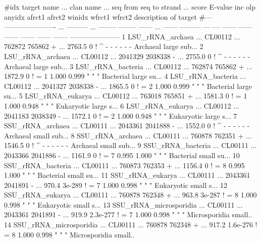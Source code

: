 \begin{tinysreoutput}
#idx target name            ... clan name ... seq from   seq to strand ...  score   E-value inc olp anyidx afrct1 afrct2 winidx wfrct1 wfrct2 description of target
#--- ---------------------- ... --------- ... -------- -------- ------ ... ------ --------- --- --- ------ ------ ------ ------ ------ ------ ---------------------
1    LSU_rRNA_archaea       ... CL00112   ...   762872   765862      + ... 2763.5         0  !   ^       -      -      -      -      -      - Archaeal large sub...
2    LSU_rRNA_archaea       ... CL00112   ...  2041329  2038338      - ... 2755.0         0  !   ^       -      -      -      -      -      - Archaeal large sub...
3    LSU_rRNA_bacteria      ... CL00112   ...   762874   765862      + ... 1872.9         0  !   =       1  1.000  0.999      "      "      " Bacterial large su...
4    LSU_rRNA_bacteria      ... CL00112   ...  2041327  2038338      - ... 1865.5         0  !   =       2  1.000  0.999      "      "      " Bacterial large su...
5    LSU_rRNA_eukarya       ... CL00112   ...   763018   765851      + ... 1581.3         0  !   =       1  1.000  0.948      "      "      " Eukaryotic large s...
6    LSU_rRNA_eukarya       ... CL00112   ...  2041183  2038349      - ... 1572.1         0  !   =       2  1.000  0.948      "      "      " Eukaryotic large s...
7    SSU_rRNA_archaea       ... CL00111   ...  2043361  2041888      - ... 1552.0         0  !   ^       -      -      -      -      -      - Archaeal small sub...
8    SSU_rRNA_archaea       ... CL00111   ...   760878   762351      + ... 1546.5         0  !   ^       -      -      -      -      -      - Archaeal small sub...
9    SSU_rRNA_bacteria      ... CL00111   ...  2043366  2041886      - ... 1161.9         0  !   =       7  0.995  1.000      "      "      " Bacterial small su...
10   SSU_rRNA_bacteria      ... CL00111   ...   760873   762353      + ... 1156.4         0  !   =       8  0.995  1.000      "      "      " Bacterial small su...
11   SSU_rRNA_eukarya       ... CL00111   ...  2043361  2041891      - ...  970.4    3e-289  !   =       7  1.000  0.998      "      "      " Eukaryotic small s...
12   SSU_rRNA_eukarya       ... CL00111   ...   760878   762348      + ...  963.8    3e-287  !   =       8  1.000  0.998      "      "      " Eukaryotic small s...
13   SSU_rRNA_microsporidia ... CL00111   ...  2043361  2041891      - ...  919.9  2.3e-277  !   =       7  1.000  0.998      "      "      " Microsporidia small..
14   SSU_rRNA_microsporidia ... CL00111   ...   760878   762348      + ...  917.2  1.6e-276  !   =       8  1.000  0.998      "      "      " Microsporidia small..

\end{tinysreoutput}

